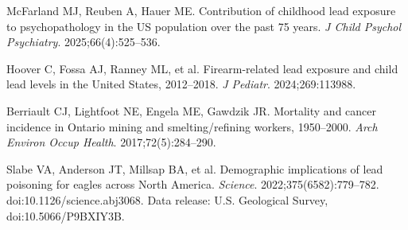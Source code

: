 \documentclass[11pt,twocolumn]{article}
\begin{document}
{\begin{enumerate}[label={[\arabic*]}, leftmargin=*, itemsep=1pt]
    \item McFarland MJ, Reuben A, Hauer ME. Contribution of childhood lead exposure to psychopathology in the US population over the past 75 years. \textit{J Child Psychol Psychiatry}. 2025;66(4):525--536.
    \item Hoover C, Fossa AJ, Ranney ML, et al. Firearm-related lead exposure and child lead levels in the United States, 2012--2018. \textit{J Pediatr}. 2024;269:113988.
    \item Berriault CJ, Lightfoot NE, Engela ME, Gawdzik JR. Mortality and cancer incidence in Ontario mining and smelting/refining workers, 1950--2000. \textit{Arch Environ Occup Health}. 2017;72(5):284--290.
    \item Slabe VA, Anderson JT, Millsap BA, et al. Demographic implications of lead poisoning for eagles across North America. \textit{Science}. 2022;375(6582):779--782. doi:10.1126/science.abj3068. Data release: U.S. Geological Survey, doi:10.5066/P9BXIY3B.
\end{enumerate}
}
\end{document}
